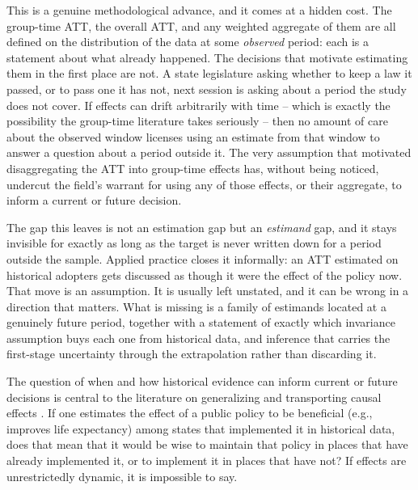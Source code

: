 \documentclass{article}
\begin{document}
This is a genuine methodological advance, and it comes at a hidden cost. The group-time ATT, the overall ATT, and any weighted aggregate of them are all defined on the distribution of the data at some \emph{observed} period: each is a statement about what already happened. The decisions that motivate estimating them in the first place are not. A state legislature asking whether to keep a law it passed, or to pass one it has not, next session is asking about a period the study does not cover. If effects can drift arbitrarily with time -- which is exactly the possibility the group-time literature takes seriously -- then no amount of care about the observed window licenses using an estimate from that window to answer a question about a period outside it. The very assumption that motivated disaggregating the ATT into group-time effects has, without being noticed, undercut the field's warrant for using any of those effects, or their aggregate, to inform a current or future decision.

The gap this leaves is not an estimation gap but an \emph{estimand} gap, and it stays invisible for exactly as long as the target is never written down for a period outside the sample. Applied practice closes it informally: an ATT estimated on historical adopters gets discussed as though it were the effect of the policy now. That move is an assumption. It is usually left unstated, and it can be wrong in a direction that matters. What is missing is a family of estimands located at a genuinely future period, together with a statement of exactly which invariance assumption buys each one from historical data, and inference that carries the first-stage uncertainty through the extrapolation rather than discarding it.

The question of when and how historical evidence can inform current or future decisions is central to the literature on generalizing and transporting causal effects \citep{coleGeneralizingEvidenceRandomized2010,tiptonImprovingGeneralizationsExperiments2013,manskiPublicPolicyUncertain2013}. If one estimates the effect of a public policy to be beneficial (e.g., improves life expectancy) among states that implemented it in historical data, does that mean that it would be wise to maintain that policy in places that have already implemented it, or to implement it in places that have not? If effects are unrestrictedly dynamic, it is impossible to say.
\end{document}

